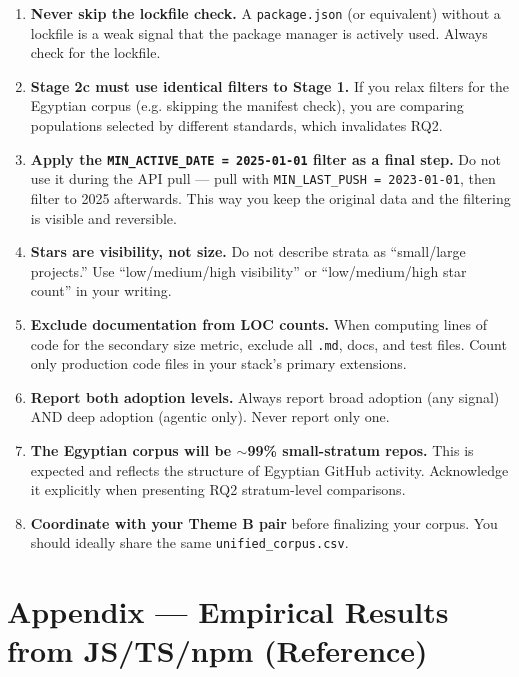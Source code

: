 \documentclass[11pt,a4paper]{article}
\begin{document}
\begin{enumerate}
    \item \textbf{Never skip the lockfile check.} A \texttt{package.json} (or equivalent) without a lockfile is a weak signal that the package manager is actively used. Always check for the lockfile.

    \item \textbf{Stage 2c must use identical filters to Stage 1.} If you relax filters for the Egyptian corpus (e.g. skipping the manifest check), you are comparing populations selected by different standards, which invalidates RQ2.

    \item \textbf{Apply the \texttt{MIN\_ACTIVE\_DATE = 2025-01-01} filter as a final step.} Do not use it during the API pull — pull with \texttt{MIN\_LAST\_PUSH = 2023-01-01}, then filter to 2025 afterwards. This way you keep the original data and the filtering is visible and reversible.

    \item \textbf{Stars are visibility, not size.} Do not describe strata as ``small/large projects.'' Use ``low/medium/high visibility'' or ``low/medium/high star count'' in your writing.

    \item \textbf{Exclude documentation from LOC counts.} When computing lines of code for the secondary size metric, exclude all \texttt{.md}, docs, and test files. Count only production code files in your stack's primary extensions.

    \item \textbf{Report both adoption levels.} Always report broad adoption (any signal) AND deep adoption (agentic only). Never report only one.

    \item \textbf{The Egyptian corpus will be $\sim$99\% small-stratum repos.} This is expected and reflects the structure of Egyptian GitHub activity. Acknowledge it explicitly when presenting RQ2 stratum-level comparisons.

    \item \textbf{Coordinate with your Theme B pair} before finalizing your corpus. You should ideally share the same \texttt{unified\_corpus.csv}.
\end{enumerate}

\section*{Appendix — Empirical Results from JS/TS/npm (Reference)}
\end{document}
